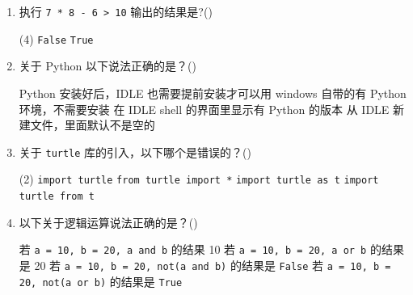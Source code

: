 \documentclass[11pt]{ctexart}
\begin{document}
\begin{enumerate}
        \newpage
        \item 执行 \lstinline{7 * 8 - 6 > 10} 输出的结果是?(\qquad)
        \begin{tasks}(4)
            \task \lstinline{False}
            \task \lstinline{True}
        \end{tasks}

        \item 关于 Python 以下说法正确的是？(\qquad)
        \begin{tasks}
            \task Python 安装好后，IDLE 也需要提前安装才可以用
            \task windows 自带的有 Python 环境，不需要安装
            \task 在 IDLE shell 的界面里显示有 Python 的版本
            \task 从 IDLE 新建文件，里面默认不是空的
        \end{tasks}

        \item 关于 \lstinline{turtle} 库的引入，以下哪个是错误的？(\qquad)
        \begin{tasks}(2)
            \task \lstinline{import turtle}
            \task \lstinline{from turtle import *}
            \task \lstinline{import turtle as t}
            \task \lstinline{import turtle from t}
        \end{tasks}

        \item 以下关于逻辑运算说法正确的是？(\qquad)
        \begin{tasks}
            \task 若 \lstinline{a = 10, b = 20, a and b} 的结果 10
            \task 若 \lstinline{a = 10, b = 20, a or b} 的结果是 20
            \task 若 \lstinline{a = 10, b = 20, not(a and b)} 的结果是 \lstinline{False}
            \task 若 \lstinline{a = 10, b = 20, not(a or b)} 的结果是 \lstinline{True}
        \end{tasks}
    \end{enumerate}
\end{document}
